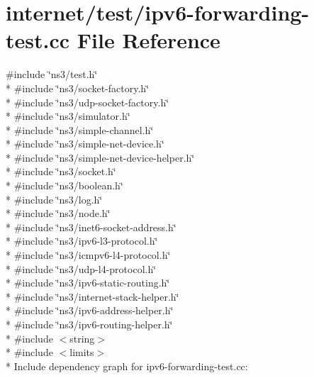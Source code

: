 \hypertarget{ipv6-forwarding-test_8cc}{}\section{internet/test/ipv6-\/forwarding-\/test.cc File Reference}
\label{ipv6-forwarding-test_8cc}
{\ttfamily \#include \char`\"{}ns3/test.\+h\char`\"{}}\\*
{\ttfamily \#include \char`\"{}ns3/socket-\/factory.\+h\char`\"{}}\\*
{\ttfamily \#include \char`\"{}ns3/udp-\/socket-\/factory.\+h\char`\"{}}\\*
{\ttfamily \#include \char`\"{}ns3/simulator.\+h\char`\"{}}\\*
{\ttfamily \#include \char`\"{}ns3/simple-\/channel.\+h\char`\"{}}\\*
{\ttfamily \#include \char`\"{}ns3/simple-\/net-\/device.\+h\char`\"{}}\\*
{\ttfamily \#include \char`\"{}ns3/simple-\/net-\/device-\/helper.\+h\char`\"{}}\\*
{\ttfamily \#include \char`\"{}ns3/socket.\+h\char`\"{}}\\*
{\ttfamily \#include \char`\"{}ns3/boolean.\+h\char`\"{}}\\*
{\ttfamily \#include \char`\"{}ns3/log.\+h\char`\"{}}\\*
{\ttfamily \#include \char`\"{}ns3/node.\+h\char`\"{}}\\*
{\ttfamily \#include \char`\"{}ns3/inet6-\/socket-\/address.\+h\char`\"{}}\\*
{\ttfamily \#include \char`\"{}ns3/ipv6-\/l3-\/protocol.\+h\char`\"{}}\\*
{\ttfamily \#include \char`\"{}ns3/icmpv6-\/l4-\/protocol.\+h\char`\"{}}\\*
{\ttfamily \#include \char`\"{}ns3/udp-\/l4-\/protocol.\+h\char`\"{}}\\*
{\ttfamily \#include \char`\"{}ns3/ipv6-\/static-\/routing.\+h\char`\"{}}\\*
{\ttfamily \#include \char`\"{}ns3/internet-\/stack-\/helper.\+h\char`\"{}}\\*
{\ttfamily \#include \char`\"{}ns3/ipv6-\/address-\/helper.\+h\char`\"{}}\\*
{\ttfamily \#include \char`\"{}ns3/ipv6-\/routing-\/helper.\+h\char`\"{}}\\*
{\ttfamily \#include $<$string$>$}\\*
{\ttfamily \#include $<$limits$>$}\\*
Include dependency graph for ipv6-\/forwarding-\/test.cc\+:
